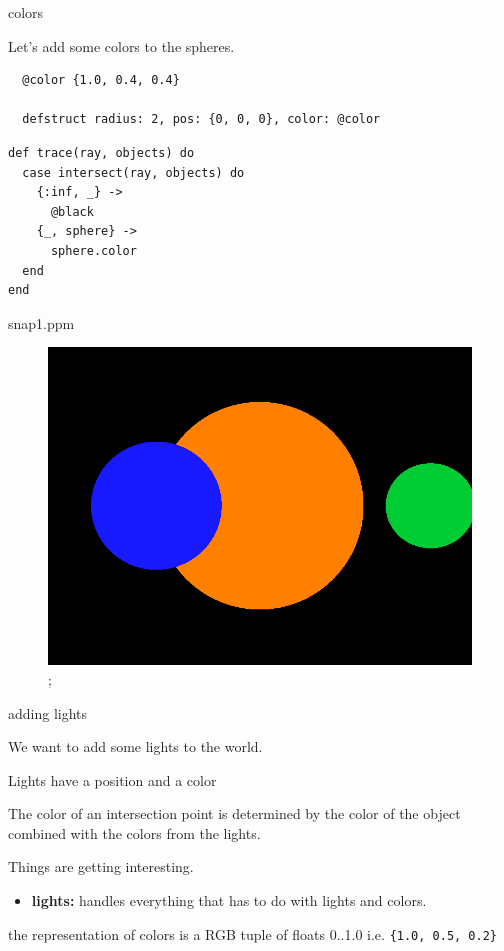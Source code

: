 \begin{frame}[fragile]{colors}

\pause Let's add some colors to the spheres.

\begin{verbatim}
  @color {1.0, 0.4, 0.4}

  defstruct radius: 2, pos: {0, 0, 0}, color: @color 
\end{verbatim}

\pause
\begin{verbatim}
def trace(ray, objects) do
  case intersect(ray, objects) do
    {:inf, _} ->
      @black
    {_, sphere} ->
      sphere.color
  end
end
\end{verbatim}
\end{frame}


\begin{frame}{snap1.ppm}

\begin{figure}
\includegraphics[scale=0.3]{snap1.png};
\end{figure}

\end{frame}


\begin{frame}[fragile]{adding lights}

\pause We want to add some lights to the world.

\pause 
\vspace{10pt}Lights have a position and a color

\pause \vspace{10pt}The color of an intersection point is determined
by the color of the object combined with the colors from the lights.

\pause 
\vspace{10pt}Things are getting interesting.

\begin{itemize}
\item {\bf lights:} handles everything that has to do with lights and colors.
\end{itemize}

\pause \vspace{20pt}
the representation of colors is a RGB tuple of floats 0..1.0 i.e. \verb+{1.0, 0.5, 0.2}+

\end{frame}


